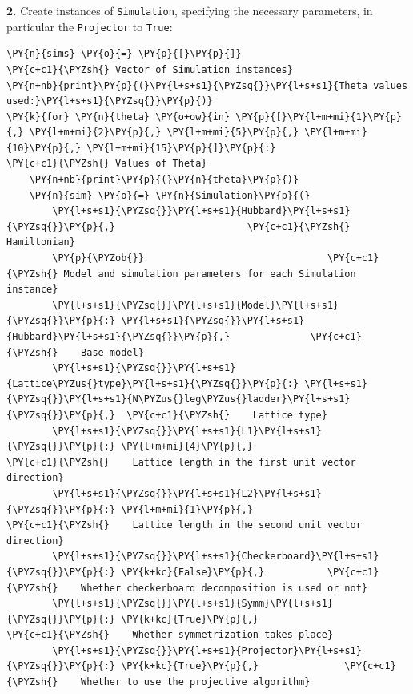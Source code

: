     \textbf{2.} Create instances of \texttt{Simulation}, specifying the
necessary parameters, in particular the \texttt{Projector} to
\texttt{True}:

    \begin{tcolorbox}[breakable, size=fbox, boxrule=1pt, pad at break*=1mm,colback=cellbackground, colframe=cellborder]
\begin{Verbatim}[commandchars=\\\{\}]
\PY{n}{sims} \PY{o}{=} \PY{p}{[}\PY{p}{]}                                \PY{c+c1}{\PYZsh{} Vector of Simulation instances}
\PY{n+nb}{print}\PY{p}{(}\PY{l+s+s1}{\PYZsq{}}\PY{l+s+s1}{Theta values used:}\PY{l+s+s1}{\PYZsq{}}\PY{p}{)}
\PY{k}{for} \PY{n}{theta} \PY{o+ow}{in} \PY{p}{[}\PY{l+m+mi}{1}\PY{p}{,} \PY{l+m+mi}{2}\PY{p}{,} \PY{l+m+mi}{5}\PY{p}{,} \PY{l+m+mi}{10}\PY{p}{,} \PY{l+m+mi}{15}\PY{p}{]}\PY{p}{:}                \PY{c+c1}{\PYZsh{} Values of Theta}
    \PY{n+nb}{print}\PY{p}{(}\PY{n}{theta}\PY{p}{)}
    \PY{n}{sim} \PY{o}{=} \PY{n}{Simulation}\PY{p}{(}
        \PY{l+s+s1}{\PYZsq{}}\PY{l+s+s1}{Hubbard}\PY{l+s+s1}{\PYZsq{}}\PY{p}{,}                       \PY{c+c1}{\PYZsh{} Hamiltonian}
        \PY{p}{\PYZob{}}                                \PY{c+c1}{\PYZsh{} Model and simulation parameters for each Simulation instance}
        \PY{l+s+s1}{\PYZsq{}}\PY{l+s+s1}{Model}\PY{l+s+s1}{\PYZsq{}}\PY{p}{:} \PY{l+s+s1}{\PYZsq{}}\PY{l+s+s1}{Hubbard}\PY{l+s+s1}{\PYZsq{}}\PY{p}{,}              \PY{c+c1}{\PYZsh{}    Base model}
        \PY{l+s+s1}{\PYZsq{}}\PY{l+s+s1}{Lattice\PYZus{}type}\PY{l+s+s1}{\PYZsq{}}\PY{p}{:} \PY{l+s+s1}{\PYZsq{}}\PY{l+s+s1}{N\PYZus{}leg\PYZus{}ladder}\PY{l+s+s1}{\PYZsq{}}\PY{p}{,}  \PY{c+c1}{\PYZsh{}    Lattice type}
        \PY{l+s+s1}{\PYZsq{}}\PY{l+s+s1}{L1}\PY{l+s+s1}{\PYZsq{}}\PY{p}{:} \PY{l+m+mi}{4}\PY{p}{,}                         \PY{c+c1}{\PYZsh{}    Lattice length in the first unit vector direction}
        \PY{l+s+s1}{\PYZsq{}}\PY{l+s+s1}{L2}\PY{l+s+s1}{\PYZsq{}}\PY{p}{:} \PY{l+m+mi}{1}\PY{p}{,}                         \PY{c+c1}{\PYZsh{}    Lattice length in the second unit vector direction}
        \PY{l+s+s1}{\PYZsq{}}\PY{l+s+s1}{Checkerboard}\PY{l+s+s1}{\PYZsq{}}\PY{p}{:} \PY{k+kc}{False}\PY{p}{,}           \PY{c+c1}{\PYZsh{}    Whether checkerboard decomposition is used or not}
        \PY{l+s+s1}{\PYZsq{}}\PY{l+s+s1}{Symm}\PY{l+s+s1}{\PYZsq{}}\PY{p}{:} \PY{k+kc}{True}\PY{p}{,}                    \PY{c+c1}{\PYZsh{}    Whether symmetrization takes place}
        \PY{l+s+s1}{\PYZsq{}}\PY{l+s+s1}{Projector}\PY{l+s+s1}{\PYZsq{}}\PY{p}{:} \PY{k+kc}{True}\PY{p}{,}               \PY{c+c1}{\PYZsh{}    Whether to use the projective algorithm}

\end{Verbatim}
\end{tcolorbox}
